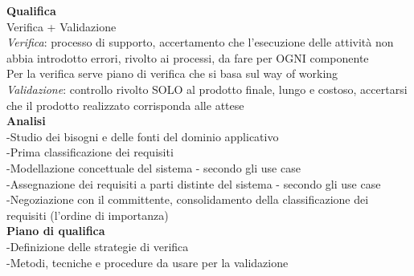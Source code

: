 \documentclass{article}
\begin{document}
		\textbf{Qualifica}\\
		Verifica + Validazione\\
		\textit{Verifica}: processo di supporto, accertamento che l'esecuzione delle attività non abbia introdotto errori, rivolto ai processi, da fare per OGNI componente\\
		Per la verifica serve piano di verifica che si basa sul way of working\\
		\textit{Validazione}: controllo rivolto SOLO al prodotto finale, lungo e costoso, accertarsi che il prodotto realizzato corrisponda alle attese\\
		
		
		
		
		
		\textbf{Analisi}\\
		-Studio dei bisogni e delle fonti del dominio applicativo\\
		-Prima classificazione dei requisiti\\
		-Modellazione concettuale del sistema - secondo gli use case\\
		-Assegnazione dei requisiti a parti distinte del sistema - secondo gli use case\\
		-Negoziazione con il committente, consolidamento della classificazione dei requisiti (l'ordine di importanza)\\
		
		\textbf{Piano di qualifica}\\
		-Definizione delle strategie di verifica\\
		-Metodi, tecniche e procedure da usare per la validazione\\
	
\end{document}

